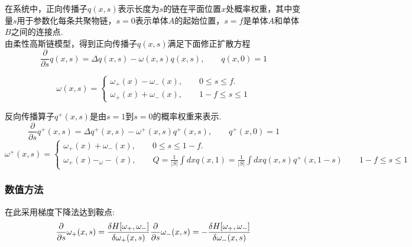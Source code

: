 \documentclass[12pt]{article}
\begin{document}
\begin{CJK}{UTF8}{gkai}
    在系统中，正向传播子$q(x,s)$表示长度为$s$的链在平面位置$x$处概率权重，其中变量$s$用于参数化每条共聚物链，$s=0$表示单体$A$的起始位置，$s=f$是单体$A$和单体$B$之间的连接点.\\
    
    由柔性高斯链模型，得到正向传播子$q(x,s)$满足下面修正扩散方程\\
    
    \begin{equation}
    \frac{\partial}{\partial s}q(x,s)=\Delta q(x,s)-\omega(x,s)q(x,s),\qquad q(x,0)=1   
    \end{equation} 
      
    \begin{equation}\label{eq:dirichlet}
    \omega(x,s)=\begin{cases}
    \omega_+(x)-\omega_-(x),\qquad 0\leq s \leq f.\\
    \omega_+(x)+\omega_-(x),\qquad 1-f\leq s \leq 1 
    \end{cases}
    \end{equation}
    

    反向传播算子$q^{+}(x,s)$是由$s=1$到$s=0$的概率权重来表示.\\
    
   \begin{equation} 
   \frac{\partial}{\partial s}q^{+}(x,s)=\Delta q^{+}(x,s)-\omega^{+}(x,s)q^{+}(x,s),\qquad q^{+}(x,0)=1 \end{equation}
    \begin{equation}\label{eq:dirichlet}
    \omega^{+}(x,s)=\begin{cases}
    \omega_+(x)+\omega_-(x),\qquad 0\leq s \leq 1-f.\\
    \omega_+(x)-_\omega-(x),\qquad  Q=\frac{1}{|S|}\int dx q(x,1)=\frac{1}{|S|}\int dx q(x,s)q^{+}(x,1-s)\qquad 1-f\leq s \leq 1 
    \end{cases}
    \end{equation}
    \subsubsection{数值方法}
    
         在此采用梯度下降法达到鞍点:\\
         
    \begin{equation}    
    \frac{\partial}{\partial s}\omega_+(x,s)=\frac{\delta H[\omega_+,\omega_-]}{\delta \omega_+(x,s)}\\
    \frac{\partial}{\partial s}\omega_-(x,s)=-\frac{\delta H[\omega_+,\omega_-]}{\delta \omega_-(x,s)}    
    \end{equation}
    

\end{CJK}
\end{document}
